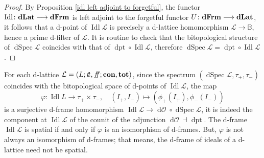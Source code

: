 \documentclass[11pt]{article}
\DeclareMathOperator{\idl}{Idl}
\DeclareMathOperator{\dSpec}{dSpec}
\DeclareMathOperator{\dO}{d\mathcal{O}}
\DeclareMathOperator{\dpt}{dpt}
\theoremstyle{plain}
\theoremstyle{definition}
\newcommand{\bbB}{\mathbb{B}}
\newcommand{\dbt}{{t\!t}}
\newcommand{\dbf}{{f\!\!f}}
\newcommand{\dLat}{\bf dLat}
\newcommand{\dFrm}{\bf dFrm}
\newcommand{\lra}{\longrightarrow}
\begin{document}
\begin{proof} By Proposition \ref{idl left adjoint to forgetful}, the functor $\idl\colon\dLat \longrightarrow \dFrm$ is left adjoint to the forgetful functor $U\colon \dFrm\longrightarrow\dLat$, it follows that a d-point of $\idl\mathcal{L}$ is precisely a d-lattice homomorphism $\mathcal{L}\lra\bbB$, hence a prime d-filter of $\mathcal{L}$.  It is routine to check that the bitopological structure of $\dSpec\mathcal{L}$ coincides with that of $\dpt\circ\idl\mathcal{L}$,   therefore $\dSpec\mathcal{L} =\dpt\circ\idl\mathcal{L}$. \end{proof}

For each d-lattice $\mathcal{L}=(L;\dbt,\dbf;{\bf con},{\bf tot})$, since the spectrum $(\dSpec\mathcal{L},\tau_+,\tau_-)$ coincides with the bitopological space of d-points of  $\idl\mathcal{L}$,  the map  $$\varphi\colon \idl L\lra \tau_+\times \tau_-, \quad (I_+,I_-) \mapsto (\phi_+(I_+), \phi_-(I_-)) $$  is a surjective d-frame homomorphism   $\idl\mathcal{L}\lra \dO\circ\dSpec\mathcal{L}$, it is indeed the component at $\idl\mathcal{L}$ of the counit of the adjunction  $\dO\dashv\dpt$. The d-frame $\idl\mathcal{L}$ is spatial if and only if $\varphi$ is an isomorphism of d-frames. But, $\varphi$ is not always an isomorphism of d-frames; that means, the d-frame  of ideals of a d-lattice need not be spatial. 
\end{document}
